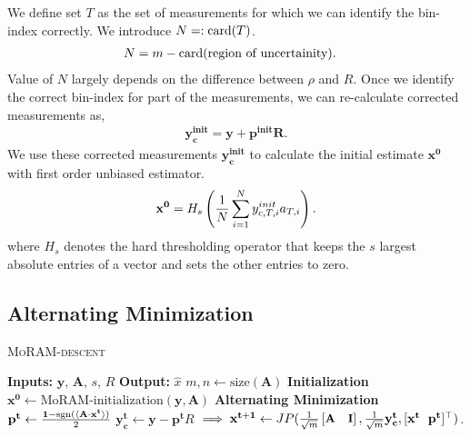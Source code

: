 We define set $T$ as the set of measurements for which we can identify the bin-index correctly. We introduce $N=: \mathrm{card}(T)$.
\begin{align*}
N & =  m - \mathrm{card}(\textnormal{region of uncertainity}).
\end{align*}
Value of $N$ largely depends on the difference between $\rho$ and $R$.
Once we identify the correct bin-index for part of the measurements, we can re-calculate corrected measurements as,
\begin{align}
\mathbf{y^{init}_{c} = y + p^{init}R}.
\label{eq:y_init}
\end{align}
We use these corrected measurements $\mathbf{y^{init}_{c}}$ to calculate the initial estimate $\mathbf{{x}^0}$ with first order unbiased estimator.%
\begin{equation}
\mathbf{x^0} = H_s\left( \frac{1}{N}\sum_{i=1}^{N}y^{init}_{c,T,i}a_{T,i}\right).
\label{eq:init}
\end{equation}
where $H_s$ denotes the hard thresholding operator that keeps the $s$ largest absolute entries of a vector and sets the other entries to zero.
\subsection{Alternating Minimization}
\label{sec:altmin}
\begin{algorithm}[t]
	\caption{\textsc{MoRAM-descent}}
	\label{alg:MoRAM}
	\begin{algorithmic}
		\State\textbf{Inputs:} $\mathbf{y}$, $\mathbf{A}$, $s$, $R$
		\State\textbf{Output:}  $\widehat{x}$
		\State $m,n \leftarrow \mathrm{size}(\mathbf{A})$ 
		\State \textbf{Initialization}
		\State $\mathbf{x^0} \leftarrow \textrm{MoRAM-initialization}(\mathbf{y, A})$ 
		\State \textbf{Alternating Minimization}
		\State $\mathbf{{p}^{t}} \leftarrow \frac{\mathbf{1}-\mathrm{sgn}(\langle \mathbf{A} \cdot \mathbf{x^t} \rangle)}{2}$
		\State $\mathbf{y^t_c} \leftarrow \mathbf{y} - \mathbf{p^t}R$
		\State $\implies \mathbf{{x}^{t+1}}\leftarrow \small{JP(\frac{1}{\sqrt{m}}\begin{bmatrix} \mathbf{A} & \mathbf{I} \end{bmatrix},\frac{1}{\sqrt{m}}\mathbf{y^t_c},[\mathbf{x^t~~p^t}]^\top)}$.
		\EndFor
	\end{algorithmic}
\end{algorithm}

